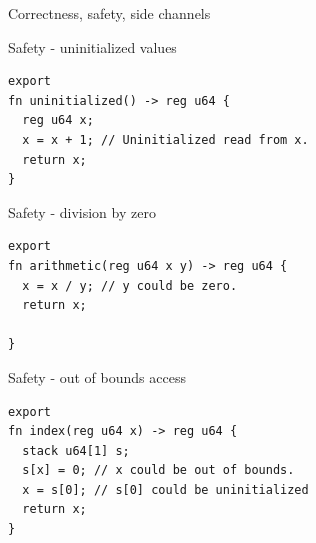 \begin{frame}{Correctness, safety, side channels}
  \begin{minipage}[t]{0.45\linewidth}
  \end{minipage}\hfill%
  \begin{minipage}[t]{0.45\linewidth}
  \end{minipage}
\end{frame}


\begin{frame}[fragile]{Safety - uninitialized values}
  \lstset{
    language=Jasmin,
    basicstyle=\footnotesize\ttfamily,
  }
  \begin{lstlisting}
export
fn uninitialized() -> reg u64 {
  reg u64 x;
  x = x + 1; // Uninitialized read from x.
  return x;
}
  \end{lstlisting}
\end{frame}

\begin{frame}[fragile]{Safety - division by zero}
  \lstset{
    language=Jasmin,
    basicstyle=\footnotesize\ttfamily,
  }
  \begin{lstlisting}
export
fn arithmetic(reg u64 x y) -> reg u64 {
  x = x / y; // y could be zero.
  return x;

}
  \end{lstlisting}
\end{frame}


\begin{frame}[fragile]{Safety - out of bounds access}
  \lstset{
    language=Jasmin,
    basicstyle=\footnotesize\ttfamily,
  }
  \begin{lstlisting}
export
fn index(reg u64 x) -> reg u64 {
  stack u64[1] s;
  s[x] = 0; // x could be out of bounds.
  x = s[0]; // s[0] could be uninitialized
  return x;
}
  \end{lstlisting}
\end{frame}

